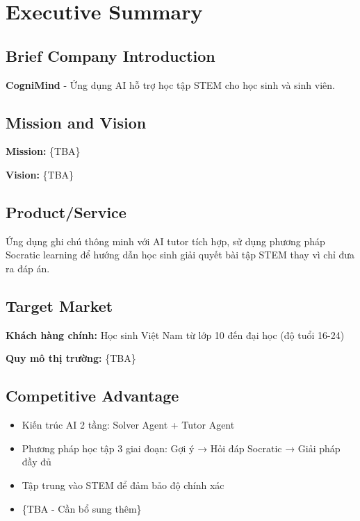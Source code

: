 \section{Executive Summary}

\subsection{Brief Company Introduction}
\textbf{CogniMind} - Ứng dụng AI hỗ trợ học tập STEM cho học sinh và sinh viên.

\subsection{Mission and Vision}
\textbf{Mission:} \{TBA\}

\textbf{Vision:} \{TBA\}

\subsection{Product/Service}
Ứng dụng ghi chú thông minh với AI tutor tích hợp, sử dụng phương pháp Socratic learning để hướng dẫn học sinh giải 
quyết bài tập STEM thay vì chỉ đưa ra đáp án.

\subsection{Target Market}
\textbf{Khách hàng chính:} Học sinh Việt Nam từ lớp 10 đến đại học (độ tuổi 16-24)

\textbf{Quy mô thị trường:} \{TBA\}

\subsection{Competitive Advantage}
\begin{itemize}
    \item Kiến trúc AI 2 tầng: Solver Agent + Tutor Agent
    \item Phương pháp học tập 3 giai đoạn: Gợi ý → Hỏi đáp Socratic → Giải pháp đầy đủ
    \item Tập trung vào STEM để đảm bảo độ chính xác
    \item \{TBA - Cần bổ sung thêm\}
\end{itemize}

